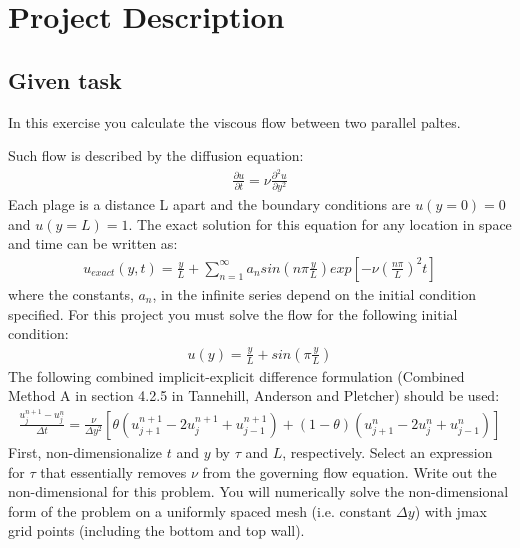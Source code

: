 \documentclass[letterpaper,10pt,english]{sphinxmanual}
\begin{document}
\section{Project Description}
\label{\detokenize{background::doc}}\label{\detokenize{background:project-description}}

\subsection{Given task}
\label{\detokenize{background:given-task}}
In this exercise you calculate the viscous flow between two parallel paltes.

Such flow is described by the diffusion equation:
\begin{equation*}
\begin{split}\frac{\partial u}{\partial t} = \nu \frac{\partial^{2}u}{\partial y^{2}}\end{split}
\end{equation*}
Each plage is a distance L apart and the boundary conditions are \(u(y=0) = 0\) and \(u(y=L) = 1\). The exact solution for this equation for any location in space and time can be written as:
\begin{equation*}
\begin{split}u_{exact}(y,t) = \frac{y}{L} + \sum_{n=1}^{\infty } a_{n} sin\left ( n \pi \frac{y}{L} \right )exp\left [ -\nu \left ( \frac{n\pi}{L} \right )^{2} t \right ]\end{split}
\end{equation*}
where the constants, \(a_{n}\), in the infinite series depend on the initial condition specified. For this project you must solve the flow for the following initial condition:
\begin{equation*}
\begin{split}u(y)=\frac{y}{L} + sin\left ( \pi \frac{y}{L} \right )\end{split}
\end{equation*}
The following combined implicit-explicit difference formulation (Combined Method A in section 4.2.5 in Tannehill, Anderson and Pletcher) should be used:
\begin{equation*}
\begin{split}\frac{u^{n+1}_{j} - u^{n}_{j}}{\Delta t} = \frac{\nu}{\Delta y^{2}}\left [ \theta \left ( u^{n+1}_{j+1} - 2 u^{n+1}_{j} + u^{n+1}_{j-1} \right ) + (1-\theta)\left ( u^{n}_{j+1} - 2 u^{n}_{j} + u^{n}_{j-1} \right ) \right ]\end{split}
\end{equation*}
First, non-dimensionalize \(t\) and \(y\) by \(\tau\) and \(L\), respectively. Select an expression for \(\tau\) that essentially removes \(\nu\) from the governing flow equation. Write out the non-dimensional for this problem. You will numerically solve the non-dimensional form of the problem on a uniformly spaced mesh (i.e. constant \(\Delta y\)) with jmax grid points (including the bottom and top wall).
\end{document}
